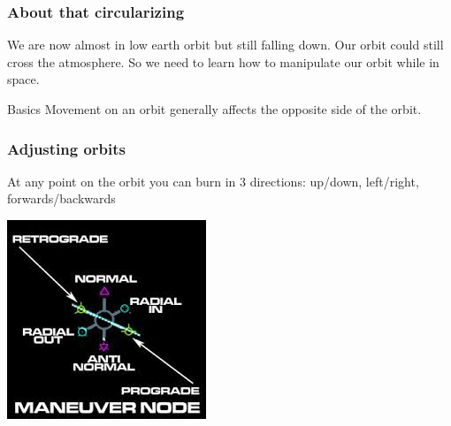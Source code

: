 {
%
\begin{frame}
\end{frame}
\begin{frame}
    \frametitle{About that circularizing}
    \begin{block}{}
        We are now almost in low earth orbit but still falling down. Our orbit could still cross the atmosphere.
        So we need to learn how to manipulate our orbit while in space.
    \end{block}
    \begin{block}{Basics}
        Movement on an orbit generally affects the opposite side of the orbit.
    \end{block}
\end{frame}
\begin{frame}
    \frametitle{Adjusting orbits}
    \begin{block}{}
        \begin{center}
            At any point on the orbit you can burn in 3 directions: up/down, left/right, forwards/backwards
        \end{center}
    \end{block}
    \begin{block}{}
        \begin{center}
            \includegraphics[scale=0.8]{images/maneuver_node.jpg}

\end{center}
\end{block}
\end{frame}}
